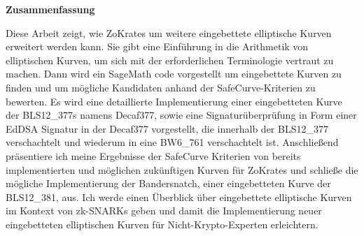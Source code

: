 \thispagestyle{empty}
\vspace*{0.2cm}

\begin{center}
    \textbf{Zusammenfassung}
\end{center}

\vspace*{0.2cm}

\noindent 
Diese Arbeit zeigt, wie ZoKrates um weitere eingebettete elliptische Kurven erweitert werden kann. Sie gibt eine Einführung in die Arithmetik  von elliptischen Kurven, um sich mit der erforderlichen Terminologie vertraut zu machen.
Dann wird ein SageMath code vorgestellt um eingebettete Kurven zu finden und um mögliche Kandidaten anhand der SafeCurve-Kriterien zu bewerten. Es wird eine detaillierte Implementierung einer eingebetteten Kurve der BLS12\_377s namens Decaf377, sowie eine Signaturüberprüfung in Form einer EdDSA Signatur in der Decaf377 vorgestellt, die innerhalb der BLS12\_377 verschachtelt und wiederum in eine BW6\_761 verschachtelt ist. Anschließend präsentiere ich meine Ergebnisse der SafeCurve Kriterien von bereits implementierten und möglichen zukünftigen Kurven für ZoKrates und schließe die mögliche Implementierung der Bandersnatch, einer eingebetteten Kurve der BLS12\_381, aus. Ich werde einen Überblick über eingebettete elliptische Kurven im Kontext von zk-SNARKs geben und damit die Implementierung neuer eingebetteten elliptischen Kurven für Nicht-Krypto-Experten erleichtern.
